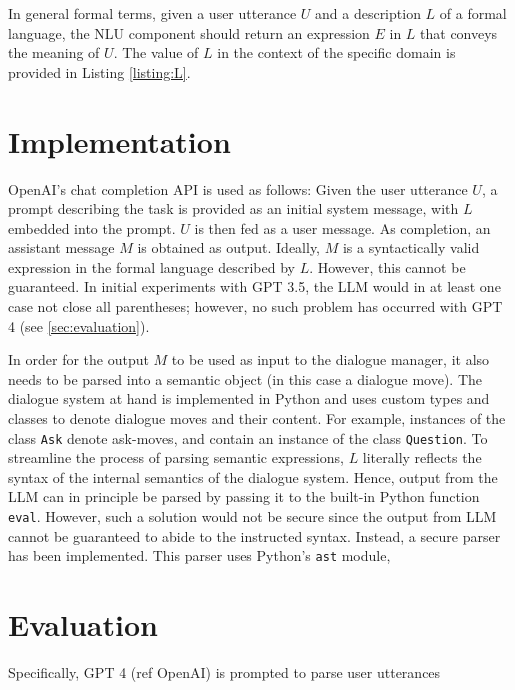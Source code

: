 \documentclass[11pt]{article}
\begin{document}
In general formal terms, given a user utterance $U$ and a description $L$ of a formal language, the NLU component should return an expression $E$ in $L$ that conveys the meaning of $U$. The value of $L$ in the context of the specific domain is provided in Listing \ref{listing:L}.



\section{Implementation}
OpenAI's chat completion API is used as follows: Given the user utterance $U$, a prompt describing the task is provided as an initial system message, with $L$ embedded into the prompt. $U$ is then fed as a user message. As completion, an assistant message $M$ is obtained as output. Ideally, $M$ is a syntactically valid expression in the formal language described by $L$. However, this cannot be guaranteed. In initial experiments with GPT 3.5, the LLM would in at least one case not close all parentheses; however, no such problem has occurred with GPT 4 (see \ref{sec:evaluation}).

In order for the output $M$ to be used as input to the dialogue manager, it also needs to be parsed into a semantic object (in this case a dialogue move). The dialogue system at hand is implemented in Python and uses custom types and classes to denote dialogue moves and their content. For example, instances of the class \texttt{Ask} denote ask-moves, and contain an instance of the class \texttt{Question}. To streamline the process of parsing semantic expressions, $L$ literally reflects the syntax of the internal semantics of the dialogue system. Hence, output from the LLM can in principle be parsed by passing it to the built-in Python function \texttt{eval}. However, such a solution would not be secure since the output from LLM cannot be guaranteed to abide to the instructed syntax. Instead, a secure parser has been implemented. This parser uses Python's \texttt{ast} module,

\section{Evaluation}


Specifically, GPT 4 (ref OpenAI) is prompted to parse user utterances
\end{document}
